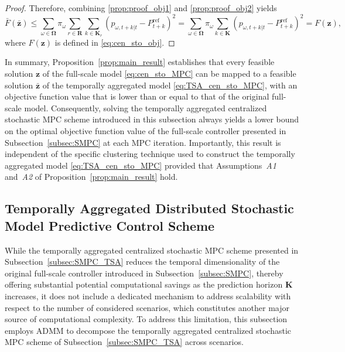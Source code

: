 \documentclass[a4paper,fleqn]{cas-sc}
\begin{document}
\begin{proof}
Therefore, combining \eqref{prop:proof_obj1} and \eqref{prop:proof_obj2} yields
\begin{equation}
\bar{F}(\boldsymbol{\bar{z}}) \leq
\sum_{\omega \in \boldsymbol{\Omega}}
\pi_{\omega}
\sum_{r \in \boldsymbol{R}} \sum_{k \in \boldsymbol{K}_r}
\left(p_{\omega,t+k|t} - P^{\mathrm{ref}}_{t+k}\right)^2
=
\sum_{\omega \in \boldsymbol{\Omega}} \pi_{\omega} \sum_{k \in \boldsymbol{K}}
\left(p_{\omega,t+k|t} - P^{\mathrm{ref}}_{t+k}\right)^2
=
F(\boldsymbol{z}),
\end{equation}
where $F(\boldsymbol{z})$ is defined in \eqref{eq:cen_sto_obj}.
\end{proof}

In summary, Proposition~\ref{prop:main_result} establishes that every feasible solution $\boldsymbol{z}$ of the full-scale model \eqref{eq:cen_sto_MPC} can be mapped to a feasible solution $\boldsymbol{\bar{z}}$ of the temporally aggregated model \eqref{eq:TSA_cen_sto_MPC}, with an objective function value that is lower than or equal to that of the original full-scale model.
Consequently, solving the temporally aggregated centralized stochastic MPC scheme introduced in this subsection always yields a lower bound on the optimal objective function value of the full-scale controller presented in Subsection~\ref{subsec:SMPC} at each MPC iteration. 
Importantly, this result is independent of the specific clustering technique used to construct the temporally aggregated model \eqref{eq:TSA_cen_sto_MPC} provided that Assumptions~\textit{A1} and~\textit{A2} of Proposition~\ref{prop:main_result} hold.

\subsection{Temporally Aggregated Distributed Stochastic Model Predictive Control Scheme}
\label{subsec:DSMPC_TSA}

While the temporally aggregated centralized stochastic MPC scheme presented in Subsection~\ref{subsec:SMPC_TSA} reduces the temporal dimensionality of the original full-scale controller introduced in Subsection~\ref{subsec:SMPC}, 
thereby offering substantial potential computational savings as the prediction horizon $\boldsymbol{K}$ increases,
it does not include a dedicated mechanism to address scalability with respect to the number of considered scenarios,
which constitutes another major source of computational complexity.
To address this limitation, this subsection employs ADMM to decompose the temporally aggregated centralized stochastic MPC scheme of Subsection~\ref{subsec:SMPC_TSA} across scenarios.
\end{document}

